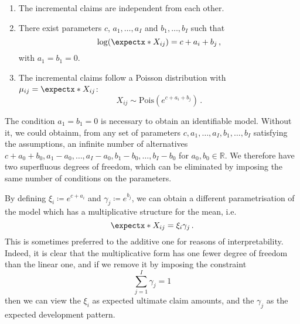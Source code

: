 \documentclass[a4paper]{book}
\begin{document}
\begin{model} \leavevmode \label{model:poisson}
  \begin{enumerate}[label=\bf{\textup{(}Pois\arabic*\textup{)}},ref=\textup{(}Pois\arabic*\textup{)}, wide]
    \item \label{assump:poisson1}
          The incremental claims are independent from each other.
    \item \label{assump:poisson2}
          There exist parameters $c$, $a_1, \dots, a_I$ and $b_1, \dots, b_I$ such that
          \begin{equation} \label{eq:linear-predictor-poisson}
            \log(\expect{X_{ij}}) = c + a_i + b_j \,,
          \end{equation}
          with $a_1 = b_1 = 0$.
    \item \label{assump:poisson3}
          The incremental claims follow a Poisson distribution with $\mu_{ij} = \expect{X_{ij}}$:
          \begin{equation}
            X_{ij} \sim \mathrm{Pois}(e^{c + a_i + b_j}) \,.
          \end{equation}
  \end{enumerate}
\end{model}

The condition $a_1 = b_1 = 0$ is necessary to obtain an identifiable model. Without it, we could obtainm, from any set of parameters $c, a_1, \dots, a_I, b_1, \dots, b_I$ satisfying the assumptions, an infinite number of alternatives $c + a_0 + b_0, a_1 - a_0, \dots, a_I - a_0, b_1 - b_0, \dots, b_I - b_0$ for $a_0, b_0 \in \mathbb{R}$. We therefore have two superfluous degrees of freedom, which can be eliminated by imposing the same number of conditions on the parameters.

By defining $\xi_i \coloneqq e^{c + a_i}$ and $\gamma_j \coloneqq e^{b_j}$, we can obtain a different parametrisation of the model which has a multiplicative structure for the mean, i.e.
\begin{equation}
  \expect{X_{ij}} = \xi_i \gamma_j \,.
\end{equation}
This is sometimes preferred to the additive one for reasons of interpretability. Indeed, it is clear that the multiplicative form has one fewer degree of freedom than the linear one, and if we remove it by imposing the constraint
\begin{equation}
  \sum_{j = 1}^I \gamma_j = 1
\end{equation}
then we can view the $\xi_i$ as expected ultimate claim amounts, and the $\gamma_j$ as the expected development pattern.
\end{document}
